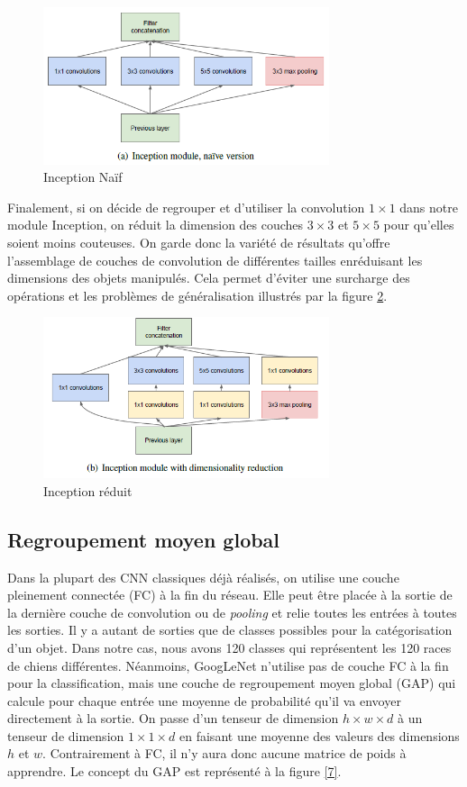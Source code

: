 \documentclass{article}
\begin{document}
\begin{figure}[htbp]
    \includegraphics[width=8.4cm]{./figures/Figure5.png} 
    \caption{Inception Naïf}
    \label{5} 
\end{figure} 

Finalement, si on décide de regrouper et d’utiliser la convolution $1\times 1$
dans notre module Inception, on réduit la dimension des couches $3\times 3$
et $5\times 5$ pour qu’elles soient moins couteuses. On garde donc la variété
de résultats qu’offre l’assemblage de couches de convolution de différentes
tailles enréduisant les dimensions des objets manipulés. Cela permet d'éviter
une surcharge des opérations et les problèmes de généralisation illustrés par la
figure \ref{6}. ~\cite{43022}

\begin{figure}[htbp]
    \includegraphics[width=8.4cm]{./figures/Figure6.png} 
    \caption{Inception réduit}
    \label{6} 
\end{figure} 

\subsection{Regroupement moyen global}
Dans la plupart des CNN classiques déjà réalisés, on utilise une couche
pleinement connectée (FC) à la fin du réseau. Elle peut être placée à la sortie
de la dernière couche de convolution ou de \textit{pooling} et relie toutes les
entrées à toutes les sorties. Il y a autant de sorties que de classes possibles pour
la catégorisation d'un objet. Dans notre cas, nous avons 120 classes qui
représentent les 120 races de chiens différentes. Néanmoins, GoogLeNet n’utilise pas
de couche FC à la fin pour la classification, mais une couche de regroupement moyen
global (GAP) qui calcule pour chaque entrée une moyenne de probabilité qu’il va
envoyer directement à la sortie. On passe d'un tenseur de dimension $h \times w \times
d$ à un tenseur de dimension $1 \times 1 \times d$ en faisant une moyenne des valeurs
des dimensions $h$ et $w$. Contrairement à FC, il n’y aura donc aucune matrice de
poids à apprendre. Le concept du GAP est représenté à la figure \ref{7}.
~\cite{tsang_2018}
\end{document}
